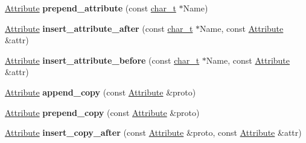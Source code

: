 \begin{DoxyCompactItemize}
\item 
\hypertarget{classphys_1_1xml_1_1Node_aef5720e2c89071706b3af7df7ad0590f}{
\hyperlink{classphys_1_1xml_1_1Attribute}{Attribute} {\bfseries prepend\_\-attribute} (const \hyperlink{namespacephys_1_1xml_afc87705cd1c2917d87b879715a2d8f6e}{char\_\-t} $\ast$Name)}
\label{d7/d0a/classphys_1_1xml_1_1Node_aef5720e2c89071706b3af7df7ad0590f}

\item 
\hypertarget{classphys_1_1xml_1_1Node_a44e0467ffc730fa9600e6b323415f94e}{
\hyperlink{classphys_1_1xml_1_1Attribute}{Attribute} {\bfseries insert\_\-attribute\_\-after} (const \hyperlink{namespacephys_1_1xml_afc87705cd1c2917d87b879715a2d8f6e}{char\_\-t} $\ast$Name, const \hyperlink{classphys_1_1xml_1_1Attribute}{Attribute} \&attr)}
\label{d7/d0a/classphys_1_1xml_1_1Node_a44e0467ffc730fa9600e6b323415f94e}

\item 
\hypertarget{classphys_1_1xml_1_1Node_a68b76b59b4935547517d03cbe61b1429}{
\hyperlink{classphys_1_1xml_1_1Attribute}{Attribute} {\bfseries insert\_\-attribute\_\-before} (const \hyperlink{namespacephys_1_1xml_afc87705cd1c2917d87b879715a2d8f6e}{char\_\-t} $\ast$Name, const \hyperlink{classphys_1_1xml_1_1Attribute}{Attribute} \&attr)}
\label{d7/d0a/classphys_1_1xml_1_1Node_a68b76b59b4935547517d03cbe61b1429}

\item 
\hypertarget{classphys_1_1xml_1_1Node_a8067d9c5861a4dc89c644eded1987b7d}{
\hyperlink{classphys_1_1xml_1_1Attribute}{Attribute} {\bfseries append\_\-copy} (const \hyperlink{classphys_1_1xml_1_1Attribute}{Attribute} \&proto)}
\label{d7/d0a/classphys_1_1xml_1_1Node_a8067d9c5861a4dc89c644eded1987b7d}

\item 
\hypertarget{classphys_1_1xml_1_1Node_a875eb8b249394050178e26d978a247cf}{
\hyperlink{classphys_1_1xml_1_1Attribute}{Attribute} {\bfseries prepend\_\-copy} (const \hyperlink{classphys_1_1xml_1_1Attribute}{Attribute} \&proto)}
\label{d7/d0a/classphys_1_1xml_1_1Node_a875eb8b249394050178e26d978a247cf}

\item 
\hypertarget{classphys_1_1xml_1_1Node_a0d12c7f719d26042afb83b8045babbf0}{
\hyperlink{classphys_1_1xml_1_1Attribute}{Attribute} {\bfseries insert\_\-copy\_\-after} (const \hyperlink{classphys_1_1xml_1_1Attribute}{Attribute} \&proto, const \hyperlink{classphys_1_1xml_1_1Attribute}{Attribute} \&attr)}
\label{d7/d0a/classphys_1_1xml_1_1Node_a0d12c7f719d26042afb83b8045babbf0}


\end{DoxyCompactItemize}
